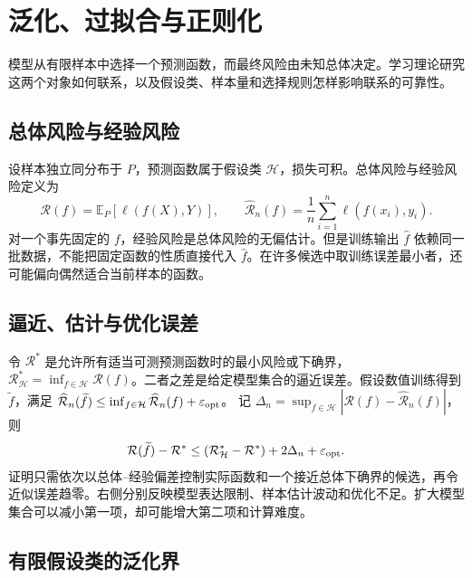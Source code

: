 \setcounter{chapter}{5} %
\chapter{泛化、过拟合与正则化}
\label{chap:ml-generalization}

模型从有限样本中选择一个预测函数，而最终风险由未知总体决定。学习理论研究这两个对象如何联系，以及假设类、样本量和选择规则怎样影响联系的可靠性。

\section{总体风险与经验风险}

设样本独立同分布于 $P$，预测函数属于假设类 $\mathcal H$，损失可积。总体风险与经验风险定义为
\begin{equation}
 \mathcal R(f)=\mathbb E_P[\ell(f(X),Y)],\qquad
 \widehat{\mathcal R}_n(f)=\frac1n\sum_{i=1}^n\ell(f(x_i),y_i).
 \label{eq:ml-risk}
\end{equation}
对一个事先固定的 $f$，经验风险是总体风险的无偏估计。但是训练输出 $\widehat f$ 依赖同一批数据，不能把固定函数的性质直接代入 $\widehat f$。在许多候选中取训练误差最小者，还可能偏向偶然适合当前样本的函数。

\section{逼近、估计与优化误差}

令 $\mathcal R^*$ 是允许所有适当可测预测函数时的最小风险或下确界，$\mathcal R_{\mathcal H}^*=\inf_{f\in\mathcal H}\mathcal R(f)$。二者之差是给定模型集合的逼近误差。假设数值训练得到 $\widetilde f$，满足
$\widehat{\mathcal R}_n(\widetilde f)\leq\inf_{f\in\mathcal H}\widehat{\mathcal R}_n(f)+\varepsilon_{\rm opt}$。
记 $\Delta_n=\sup_{f\in\mathcal H}|\mathcal R(f)-\widehat{\mathcal R}_n(f)|$，则
\[
 \mathcal R(\widetilde f)-\mathcal R^*
 \leq(\mathcal R_{\mathcal H}^*-\mathcal R^*)+2\Delta_n+\varepsilon_{\rm opt}.
\]
证明只需依次以总体--经验偏差控制实际函数和一个接近总体下确界的候选，再令近似误差趋零。右侧分别反映模型表达限制、样本估计波动和优化不足。扩大模型集合可以减小第一项，却可能增大第二项和计算难度。

\section{有限假设类的泛化界}

